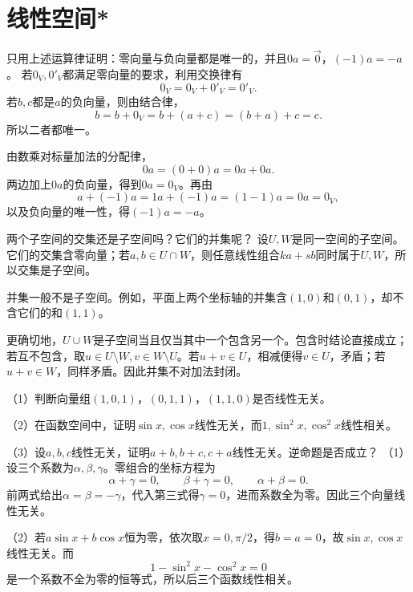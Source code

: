 \par\addvspace{12pt}

\section{线性空间*}

\label{sol:sec:vector:3}

只用上述运算律证明：零向量与负向量都是唯一的，并且\(0 a = \vec{0}\)，\(\left( - 1 \right) a = - a\)。
\solutionanswer
若\(0_V,0'_V\)都满足零向量的要求，利用交换律有
\[
0_V=0_V+0'_V=0'_V.
\]
若\(b,c\)都是\(a\)的负向量，则由结合律，
\[
b=b+0_V=b+(a+c)=(b+a)+c=c.
\]
所以二者都唯一。

由数乘对标量加法的分配律，
\[
0a=(0+0)a=0a+0a.
\]
两边加上\(0a\)的负向量，得到\(0a=0_V\)。再由
\[
a+(-1)a=1a+(-1)a=(1-1)a=0a=0_V,
\]
以及负向量的唯一性，得\((-1)a=-a\)。


两个子空间的交集还是子空间吗？它们的并集呢？
\solutionanswer
设\(U,W\)是同一空间的子空间。它们的交集含零向量；若\(a,b\in U\cap W\)，则任意线性组合\(ka+sb\)同时属于\(U,W\)，所以交集是子空间。

并集一般不是子空间。例如，平面上两个坐标轴的并集含\((1,0)\)和\((0,1)\)，却不含它们的和\((1,1)\)。

更确切地，\(U\cup W\)是子空间当且仅当其中一个包含另一个。包含时结论直接成立；若互不包含，取\(u\in U\setminus W,v\in W\setminus U\)。若\(u+v\in U\)，相减便得\(v\in U\)，矛盾；若\(u+v\in W\)，同样矛盾。因此并集不对加法封闭。


（1）判断向量组\(\left( 1 , 0 , 1 \right)\)，\(\left( 0 , 1 , 1 \right)\)，\(\left( 1 , 1 , 0 \right)\)是否线性无关。

（2）在函数空间中，证明\(\sin x , \cos x\)线性无关，而\(1 , \sin^{2} x , \cos^{2} x\)线性相关。

（3）设\(a , b , c\)线性无关，证明\(a + b , b + c , c + a\)线性无关。逆命题是否成立？
\solutionanswer
（1）设三个系数为\(\alpha,\beta,\gamma\)。零组合的坐标方程为
\[
\alpha+\gamma=0,\qquad \beta+\gamma=0,\qquad \alpha+\beta=0.
\]
前两式给出\(\alpha=\beta=-\gamma\)，代入第三式得\(\gamma=0\)，进而系数全为零。因此三个向量线性无关。

（2）若\(a\sin x+b\cos x\)恒为零，依次取\(x=0,\pi/2\)，得\(b=a=0\)，故\(\sin x,\cos x\)线性无关。而
\[
1-\sin^2x-\cos^2x=0
\]
是一个系数不全为零的恒等式，所以后三个函数线性相关。

